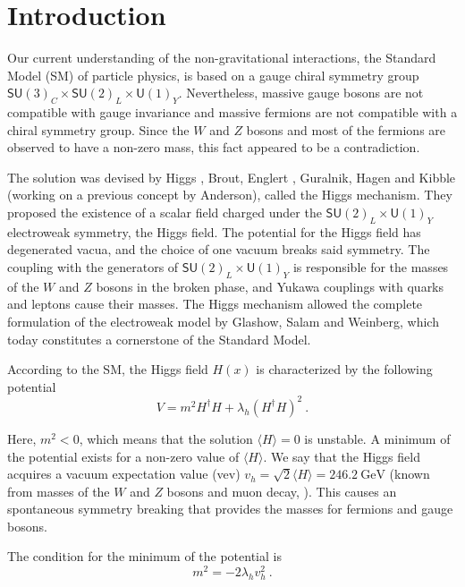 \documentclass[aps,prd,preprintnumbers,nofootinbibn,twocolumn]{revtex4}
\begin{document}
\section{Introduction}
Our current understanding of the non-gravitational interactions, the Standard Model (SM) of particle physics, is based on a gauge chiral symmetry group $\mathsf{SU}(3)_C \times \mathsf{SU}(2)_L \times \mathsf{U}(1)_Y $. Nevertheless, massive gauge bosons are not compatible with gauge invariance and massive fermions are not compatible with a chiral symmetry group. Since the $W$ and $Z$ bosons and most of the fermions are observed to have a non-zero mass, this fact appeared to be a contradiction.

The solution was devised by Higgs \cite{Higgs:1964pj}, Brout, Englert \cite{Englert:1964et}, Guralnik, Hagen and Kibble \cite{Guralnik:1964eu} (working on a previous concept by Anderson), called the Higgs mechanism. They proposed the existence of a scalar field charged under the $\mathsf{SU}(2)_L \times \mathsf{U}(1)_Y$ electroweak symmetry, the Higgs field. The potential for the Higgs field has degenerated vacua, and the choice of one vacuum breaks said symmetry. The coupling with the generators of $\mathsf{SU}(2)_L \times \mathsf{U}(1)_Y$ is responsible for the masses of the $W$ and $Z$ bosons in the broken phase, and Yukawa couplings with quarks and leptons cause their masses. The Higgs mechanism allowed the complete formulation of the electroweak model by Glashow, Salam and Weinberg, which today constitutes a cornerstone of the Standard Model.


According to the SM, the Higgs field $H(x)$ is characterized by the following potential
\begin{equation}\label{eq:HiggsPotential}
V = m^2 H^\dagger H + \lambda_h (H^\dagger H)^2\ .
\end{equation}

Here, $m^2 < 0$, which means that the solution $\langle H\rangle=0$ is unstable. A minimum of the potential exists for a non-zero value of $\langle H\rangle$. We say that the Higgs field acquires a vacuum expectation value (vev) $v_h = \sqrt{2}\langle H\rangle =\SI{246.2}{\giga\electronvolt}$ (known from masses of the $W$ and $Z$ bosons and muon decay, \cite{Agashe:2014kda}). This causes an spontaneous symmetry breaking that provides the masses for fermions and gauge bosons. 

The condition for the minimum of the potential is 
\begin{equation}
m^2 = -2\lambda_h v_h^2\ .
\end{equation}
\end{document}
